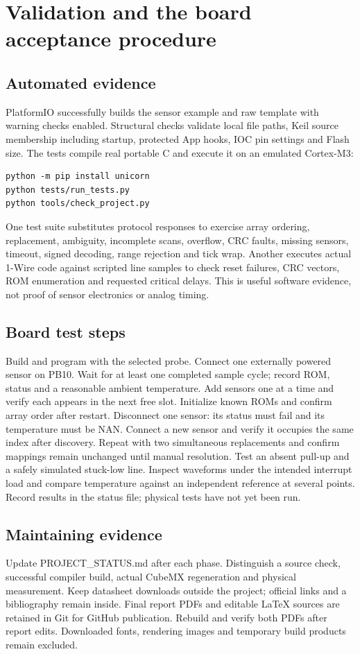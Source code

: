 \section{Validation and the board acceptance procedure}
\subsection{Automated evidence}
PlatformIO successfully builds the sensor example and raw template with warning
checks enabled. Structural checks validate local file paths, Keil source
membership including startup, protected App hooks, IOC pin settings and Flash
size. The tests compile real portable C and execute it on an emulated Cortex-M3:
\begin{lstlisting}[language={}]
python -m pip install unicorn
python tests/run_tests.py
python tools/check_project.py
\end{lstlisting}
One test suite substitutes protocol responses to exercise array ordering,
replacement, ambiguity, incomplete scans, overflow, CRC faults, missing sensors,
timeout, signed decoding, range rejection and tick wrap. Another executes actual
1-Wire code against scripted line samples to check reset failures, CRC vectors,
ROM enumeration and requested critical delays. This is useful software evidence,
not proof of sensor electronics or analog timing.

\subsection{Board test steps}
Build and program with the selected probe. Connect one externally powered sensor
on PB10. Wait for at least one completed sample cycle; record ROM, status and a
reasonable ambient temperature. Add sensors one at a time and verify each appears
in the next free slot. Initialize known ROMs and confirm array order after restart.
Disconnect one sensor: its status must fail and its temperature must be NAN.
Connect a new sensor and verify it occupies the same index after discovery.
Repeat with two simultaneous replacements and confirm mappings remain unchanged
until manual resolution. Test an absent pull-up and a safely simulated stuck-low
line. Inspect waveforms under the intended interrupt load and compare temperature
against an independent reference at several points. Record results in the status
file; physical tests have not yet been run.

\subsection{Maintaining evidence}
Update PROJECT\_STATUS.md after each phase. Distinguish a source check, successful
compiler build, actual CubeMX regeneration and physical measurement. Keep
datasheet downloads outside the project; official links and a bibliography
remain inside. Final report PDFs and editable LaTeX sources are retained in Git for GitHub
publication. Rebuild and verify both PDFs after report edits. Downloaded fonts,
rendering images and temporary build products remain excluded.
